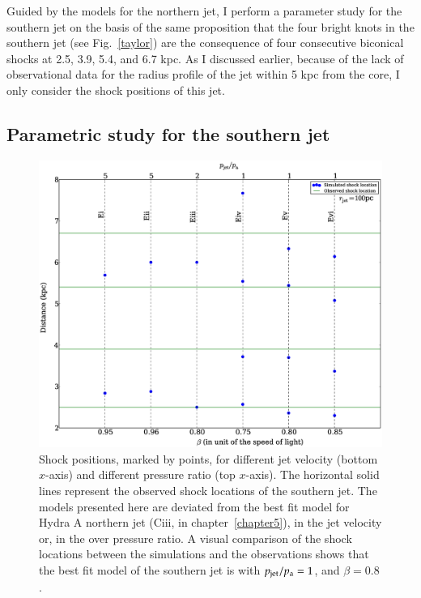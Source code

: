 Guided by the models for the northern jet, I  perform a parameter study for the southern jet on the basis of the same proposition that the four bright knots in the southern jet (see Fig.~\ref{taylor}) are the consequence of four consecutive biconical shocks at 2.5, 3.9, 5.4, and 6.7 kpc. As I  discussed earlier, because of the lack of observational data for the radius profile of the jet within 5 kpc from the core, I  only consider the shock positions of this jet.

\subsection{Parametric study for the southern jet}\label{s:param_study}
\begin{figure}[ht!]
\includegraphics[width=\textwidth]{sps.eps}
\caption{Shock positions, marked by points, for different jet velocity (bottom $x$-axis) and different pressure ratio (top $x$-axis). The horizontal solid lines represent the observed shock locations of the southern jet. The models presented here are deviated from the best fit model for Hydra A northern jet (Ciii, in chapter~\ref{chapter5}), in the jet velocity or, in the over pressure ratio. A visual comparison of the shock locations between the simulations and the observations shows that the best fit model of the southern jet is with $p_{\rm jet}/p_{\rm a}=1$, and $\beta = 0.8$.  }
\label{p_s_s}
\end{figure}


